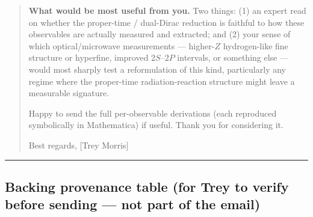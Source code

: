 \documentclass[
  11pt,
]{article}
\begin{document}
\begin{quote}
\textbf{What would be most useful from you.} Two things: (1) an expert
read on whether the proper-time / dual-Dirac reduction is faithful to
how these observables are actually measured and extracted; and (2) your
sense of which optical/microwave measurements --- higher-\(Z\)
hydrogen-like fine structure or hyperfine, improved \(2S\)--\(2P\)
intervals, or something else --- would most sharply test a reformulation
of this kind, particularly any regime where the proper-time
radiation-reaction structure might leave a measurable signature.

Happy to send the full per-observable derivations (each reproduced
symbolically in Mathematica) if useful. Thank you for considering it.

Best regards, {[}Trey Morris{]}
\end{quote}

\begin{center}\rule{0.5\linewidth}{0.5pt}\end{center}

\hypertarget{backing-provenance-table-for-trey-to-verify-before-sending-not-part-of-the-email}{%
\subsection{Backing provenance table (for Trey to verify before sending
--- not part of the
email)}\label{backing-provenance-table-for-trey-to-verify-before-sending-not-part-of-the-email}}
\end{document}

